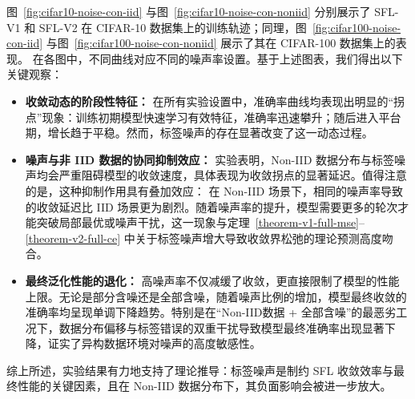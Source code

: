 图~\ref{fig:cifar10-noise-con-iid} 与图~\ref{fig:cifar10-noise-con-noniid} 分别展示了 SFL-V1 和 SFL-V2 在 CIFAR-10 数据集上的训练轨迹；同理，图~\ref{fig:cifar100-noise-con-iid} 与图~\ref{fig:cifar100-noise-con-noniid} 展示了其在 CIFAR-100 数据集上的表现。
在各图中，不同曲线对应不同的噪声率设置。基于上述图表，我们得出以下关键观察：

\begin{itemize}
    \item \textbf{收敛动态的阶段性特征：} 在所有实验设置中，准确率曲线均表现出明显的“拐点”现象：训练初期模型快速学习有效特征，准确率迅速攀升；随后进入平台期，增长趋于平稳。然而，标签噪声的存在显著改变了这一动态过程。
    
    \item \textbf{噪声与非 IID 数据的协同抑制效应：} 实验表明，Non-IID 数据分布与标签噪声均会严重阻碍模型的收敛速度，具体表现为收敛拐点的显著延迟。值得注意的是，这种抑制作用具有叠加效应：
    在 Non-IID 场景下，相同的噪声率导致的收敛延迟比 IID 场景更为剧烈。随着噪声率的提升，模型需要更多的轮次才能突破局部最优或噪声干扰，这一现象与定理~\ref{theorem-v1-full-mse}--\ref{theorem-v2-full-ce} 中关于标签噪声增大导致收敛界松弛的理论预测高度吻合。
    
    \item \textbf{最终泛化性能的退化：} 高噪声率不仅减缓了收敛，更直接限制了模型的性能上限。无论是部分含噪还是全部含噪，随着噪声比例的增加，模型最终收敛的准确率均呈现单调下降趋势。特别是在“Non-IID数据 + 全部含噪”的最恶劣工况下，数据分布偏移与标签错误的双重干扰导致模型最终准确率出现显著下降，证实了异构数据环境对噪声的高度敏感性。
\end{itemize}

综上所述，实验结果有力地支持了理论推导：标签噪声是制约 SFL 收敛效率与最终性能的关键因素，且在 Non-IID 数据分布下，其负面影响会被进一步放大。



